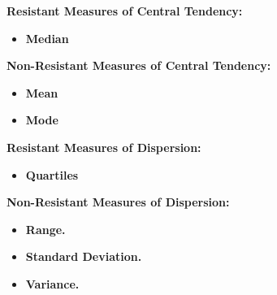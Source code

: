 \documentclass{report}
\begin{document}
       \bigbreak \noindent 
       \textbf{Resistant Measures of Central Tendency:}
       \begin{itemize}
           \item \textbf{Median}
       \end{itemize}
      \textbf{Non-Resistant Measures of Central Tendency:}
      \begin{itemize}
          \item \textbf{Mean}
          \item \textbf{Mode}
      \end{itemize}
      \bigbreak \noindent 
      \textbf{Resistant Measures of Dispersion:}
      \begin{itemize}
          \item \textbf{Quartiles}
      \end{itemize}
      \bigbreak \noindent 
    \textbf{Non-Resistant Measures of Dispersion:}
    \begin{itemize}
        \item \textbf{Range.}
        \item \textbf{Standard Deviation.}
        \item \textbf{Variance.}
    \end{itemize}
\end{document}
